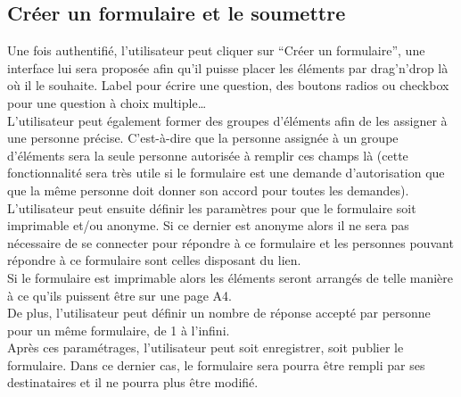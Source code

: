 \documentclass{sigplanconf}
\begin{document}
\subsection{Créer un formulaire et le soumettre}
Une fois authentifié, l'utilisateur peut cliquer sur “Créer un formulaire”, une interface lui sera proposée afin qu’il puisse placer les éléments par drag’n’drop là où il le souhaite. Label pour écrire une question, des boutons radios ou checkbox pour une question à choix multiple…\\
L’utilisateur peut également former des groupes d’éléments afin de les assigner à une personne précise. C’est-à-dire que la personne assignée à un groupe d’éléments sera la seule personne autorisée à remplir ces champs là (cette fonctionnalité sera très utile si le formulaire est une demande d’autorisation que que la même personne doit donner son accord pour toutes les demandes).\\
L’utilisateur peut ensuite définir les paramètres pour que le formulaire soit imprimable et/ou anonyme. Si ce dernier est anonyme alors il ne sera pas nécessaire de se connecter pour répondre à ce formulaire et les personnes pouvant répondre à ce formulaire sont celles disposant du lien.\\
Si le formulaire est imprimable alors les éléments seront arrangés de telle manière à ce qu’ils puissent être sur une page A4.\\
De plus, l’utilisateur peut définir un nombre de réponse accepté par personne pour un même formulaire, de 1 à l’infini.\\
Après ces paramétrages, l’utilisateur peut soit enregistrer, soit publier le formulaire. Dans ce dernier cas, le formulaire sera pourra être rempli par ses destinataires et il ne pourra plus être modifié.\\

\noindent\begin{minipage}{\linewidth}%
\label{scenarios}
\end{minipage}
\end{document}
